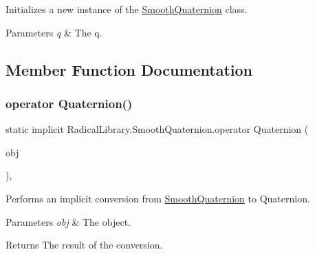Initializes a new instance of the \hyperlink{class_radical_library_1_1_smooth_quaternion}{Smooth\+Quaternion} class. 


\begin{DoxyParams}{Parameters}
{\em q} & The q.\\
\hline
\end{DoxyParams}


\subsection{Member Function Documentation}
\mbox{\label{class_radical_library_1_1_smooth_quaternion_a8ff1a27e2ca9ca02514e311abb4808f0}} 
\subsubsection{\texorpdfstring{operator Quaternion()}{operator Quaternion()}}
{\footnotesize\ttfamily static implicit Radical\+Library.\+Smooth\+Quaternion.\+operator Quaternion (\begin{DoxyParamCaption}\item[{\hyperlink{class_radical_library_1_1_smooth_quaternion}{Smooth\+Quaternion}}]{obj }\end{DoxyParamCaption})\hspace{0.3cm}{\ttfamily [inline]}, {\ttfamily [static]}}



Performs an implicit conversion from \hyperlink{class_radical_library_1_1_smooth_quaternion}{Smooth\+Quaternion} to Quaternion. 


\begin{DoxyParams}{Parameters}
{\em obj} & The object.\\
\hline
\end{DoxyParams}
\begin{DoxyReturn}{Returns}
The result of the conversion.
\end{DoxyReturn}
\mbox{\label{class_radical_library_1_1_smooth_quaternion_a08a76bbeb19fdfadcf3d092b8f86030d}} 
